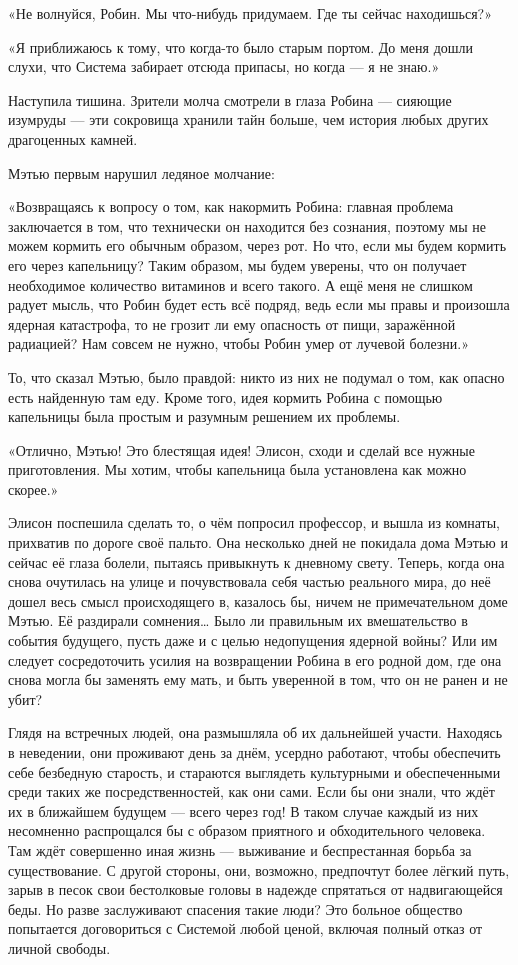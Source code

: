 \documentclass[a4paper,12pt]{book}
\begin{document}
\par
«Не волнуйся, Робин. Мы что-нибудь придумаем. Где ты сейчас находишься?»
\par
«Я приближаюсь к тому, что когда-то было старым портом. До меня дошли слухи, что Система забирает отсюда припасы, но когда — я не знаю.»
\par
Наступила тишина. Зрители молча смотрели в глаза Робина — сияющие изумруды — эти сокровища хранили тайн больше, чем история любых других драгоценных камней.
\par
Мэтью первым нарушил ледяное молчание:
\par
«Возвращаясь к вопросу о том, как накормить Робина: главная проблема заключается в том, что технически он находится без сознания, поэтому мы не можем кормить его обычным образом, через рот. Но что, если мы будем кормить его через капельницу? Таким образом, мы будем уверены, что он получает необходимое количество витаминов и всего такого. А ещё меня не слишком радует мысль, что Робин будет есть всё подряд, ведь если мы правы и произошла ядерная катастрофа, то не грозит ли ему опасность от пищи, заражённой радиацией? Нам совсем не нужно, чтобы Робин умер от лучевой болезни.»
\par
То, что сказал Мэтью, было правдой: никто из них не подумал о том, как опасно есть найденную там еду. Кроме того, идея кормить Робина с помощью капельницы была простым и разумным решением их проблемы.
\par
«Отлично, Мэтью! Это блестящая идея! Элисон, сходи и сделай все нужные приготовления. Мы хотим, чтобы капельница была установлена как можно скорее.»\\
\par
Элисон поспешила сделать то, о чём попросил профессор, и вышла из комнаты, прихватив по дороге своё пальто. Она несколько дней не покидала дома Мэтью и сейчас её глаза болели, пытаясь привыкнуть к дневному свету. Теперь, когда она снова очутилась на улице и почувствовала себя частью реального мира, до неё дошел весь смысл происходящего в, казалось бы, ничем не примечательном доме Мэтью. Её раздирали сомнения… Было ли правильным их вмешательство в события будущего, пусть даже и с целью недопущения ядерной войны? Или им следует сосредоточить усилия на возвращении Робина в его родной дом, где она снова могла бы заменять ему мать, и быть уверенной в том, что он не ранен и не убит?
\par
Глядя на встречных людей, она размышляла об их дальнейшей участи. Находясь в неведении, они проживают день за днём, усердно работают, чтобы обеспечить себе безбедную старость, и стараются выглядеть культурными и обеспеченными среди таких же посредственностей, как они сами. Если бы они знали, что ждёт их в ближайшем будущем — всего через год! В таком случае каждый из них несомненно распрощался бы с образом приятного и обходительного человека. Там ждёт совершенно иная жизнь — выживание и беспрестанная борьба за существование. С другой стороны, они, возможно, предпочтут более лёгкий путь, зарыв в песок свои бестолковые головы в надежде спрятаться от надвигающейся беды. Но разве заслуживают спасения такие люди? Это больное общество попытается договориться с Системой любой ценой, включая полный отказ от личной свободы.\\
\end{document}
